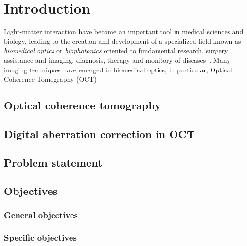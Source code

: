 \newpage
{}
\chapter{Introduction}

Light-matter interaction have become an important tool in medical sciences and biology, leading to the creation and development of a specialized field known as \textit{biomedical optics} or \textit{biophotonics} oriented to fundamental research, surgery assistance and imaging, diagnosis, therapy and monitory of diseases~\cite{}. Many imaging techniques have emerged in biomedical optics, in particular, Optical Coherence Tomography (OCT)

\section{Optical coherence tomography}

\section{Digital aberration correction in OCT}

\section{Problem statement}

\section{Objectives}

\subsection{General objectives}

\subsection{Specific objectives}